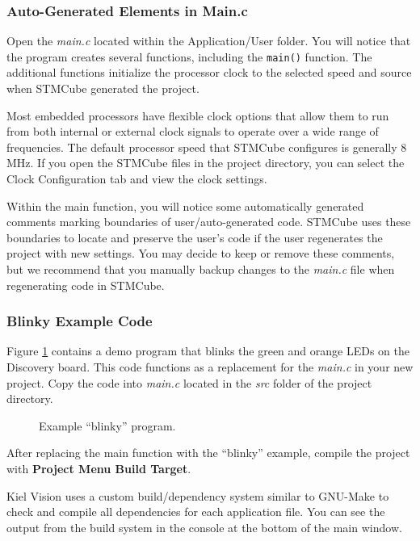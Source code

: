 \documentclass[openany,11pt,fleqn]{book} %
\newcommand{\code}[3]{
    \begin{figure}[]
        \begin{center}
            \hspace*{-3.4cm}
            \colorbox{gray!20!white}{
                \parbox{0.8\paperwidth} {
                    
                }
            }
            \caption{#2}
            \label{#3}
        \end{center}
    \end{figure}
}
\begin{document}
\subsubsection{Auto-Generated Elements in Main.c}
Open the \textit{main.c} located within the Application/User folder. You will notice that the program creates several functions, including the  \texttt{main()} function. The additional functions initialize the processor clock to the selected speed and source when STMCube generated the project. 

Most embedded processors have flexible clock options that allow them to run from both internal or external clock signals to operate over a wide range of frequencies. The default processor speed that STMCube configures is generally 8 MHz. If you open the STMCube files in the project directory, you can select the Clock Configuration tab and view the clock settings.

Within the main function, you will notice some automatically generated comments marking boundaries of user/auto-generated code. STMCube uses these boundaries to locate and preserve the user's code if the user regenerates the project with new settings. You may decide to keep or remove these comments, but we recommend that you manually backup changes to the \textit{main.c} file when regenerating code in STMCube. 

\subsubsection{\color{orange}Blinky Example Code}
Figure \ref{blinky1} contains a demo program that blinks the green and orange LEDs on the Discovery board. This code functions as a replacement for the \textit{main.c} in your new project. Copy the code into \textit{main.c} located in the \textit{src} folder of the project directory. 

%		

\code{./Files/blinky.c}{Example ``blinky'' program.}{blinky1}

After replacing the main function with the ``blinky'' example, compile the project with \textbf{Project Menu \textrightarrow Build Target}. 

Kiel {\textmu}Vision uses a custom build/dependency system similar to GNU-Make to check and compile all dependencies for each application file. You can see the output from the build system in the console at the bottom of the main window.
\end{document}
